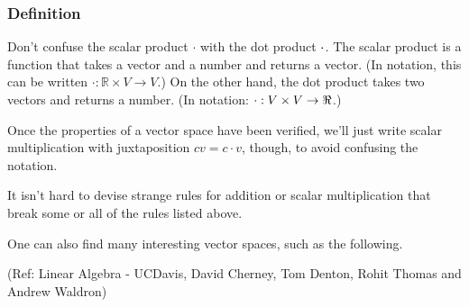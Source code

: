 \begin{frame}[fragile]
\frametitle{Definition}
\begin{remark}
Don't confuse the scalar product $\cdot$ with the dot product $\cdot$.  The scalar product is a function that takes a vector and a number and returns a vector.  (In notation, this can be written $\cdot: \mathbb{R}\times V \rightarrow V$.)  On the other hand, the dot product takes two vectors and returns a number.  (In notation: $\cdot: V\times V \rightarrow \Re$.)

Once the properties of a vector space have been verified, we'll just write scalar multiplication with juxtaposition $cv=c\cdot v$, though, to avoid confusing the notation.
\end{remark}

\begin{remark}
It isn't hard to devise strange rules for addition or scalar multiplication that break some or all of the rules listed above.

One can also find many interesting vector spaces, such as the following.
\end{remark}

\tiny{(Ref: Linear Algebra - UCDavis, David Cherney, Tom Denton, Rohit Thomas and Andrew Waldron)}


\end{frame}

